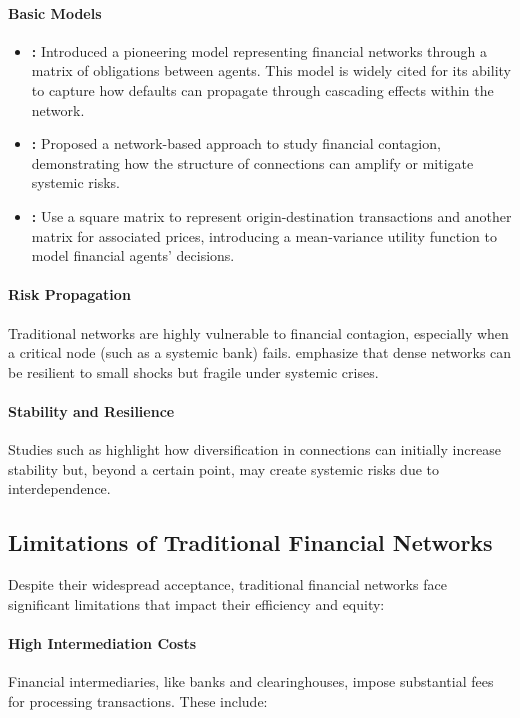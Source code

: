 \paragraph{Basic Models}
\begin{itemize}
    \item \textbf{:} Introduced a pioneering model representing financial networks through a matrix of obligations between agents. This model is widely cited for its ability to capture how defaults can propagate through cascading effects within the network.
    \item \textbf{:} Proposed a network-based approach to study financial contagion, demonstrating how the structure of connections can amplify or mitigate systemic risks.
    \item \textbf{:} Use a square matrix to represent origin-destination transactions and another matrix for associated prices, introducing a mean-variance utility function to model financial agents' decisions.
\end{itemize}

\paragraph{Risk Propagation}
Traditional networks are highly vulnerable to financial contagion, especially when a critical node (such as a systemic bank) fails.  emphasize that dense networks can be resilient to small shocks but fragile under systemic crises.

\paragraph{Stability and Resilience}
Studies such as  highlight how diversification in connections can initially increase stability but, beyond a certain point, may create systemic risks due to interdependence.

\subsection{Limitations of Traditional Financial Networks}

Despite their widespread acceptance, traditional financial networks face significant limitations that impact their efficiency and equity:

\paragraph{High Intermediation Costs}
Financial intermediaries, like banks and clearinghouses, impose substantial fees for processing transactions. These include:

